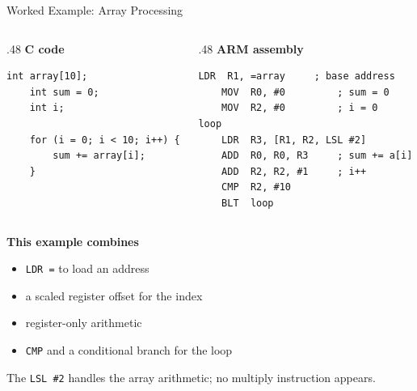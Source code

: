 \documentclass[9pt,aspectratio=169,xcolor=table]{beamer}
\begin{document}
\begin{frame}[fragile]{Worked Example: Array Processing}
	\begin{columns}[T]
		\begin{column}{.48\textwidth}
			\textbf{C code}
			\begin{lstlisting}[style=myc]
	int array[10];
	int sum = 0;
	int i;

	for (i = 0; i < 10; i++) {
		sum += array[i];
	}
			\end{lstlisting}
		\end{column}
		\begin{column}{.48\textwidth}
			\textbf{ARM assembly}
			\begin{lstlisting}[style=armasm, language=ARM]
	LDR  R1, =array     ; base address
	MOV  R0, #0         ; sum = 0
	MOV  R2, #0         ; i = 0
loop
	LDR  R3, [R1, R2, LSL #2]
	ADD  R0, R0, R3     ; sum += a[i]
	ADD  R2, R2, #1     ; i++
	CMP  R2, #10
	BLT  loop
			\end{lstlisting}
		\end{column}
	\end{columns}

	\vspace{3mm}
	\textbf{This example combines}
	{\small
		\begin{itemize}\itemsep1pt
			\item \texttt{LDR =} to load an address
			\item a \alert{scaled register offset} for the index
			\item register-only arithmetic
			\item \texttt{CMP} and a conditional branch for the loop
	\end{itemize}}

	\vspace{2mm}
	{\small The \texttt{LSL \#2} handles the array arithmetic;
		no multiply instruction appears.}
\end{frame}
\end{document}
